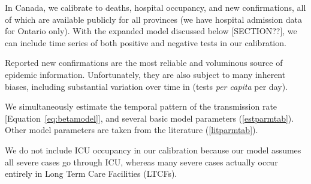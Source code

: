 \documentclass[12pt]{article}\usepackage[]{graphicx}\usepackage[]{color}
\begin{document}
In Canada, we calibrate
to deaths, hospital occupancy, and new confirmations, all of which are
available publicly for all provinces (we have hospital admission data
for Ontario only).  With the expanded model discussed below [SECTION??],
we can include time series of both positive
and negative tests in our calibration. 

 

Reported new confirmations are the most reliable and voluminous source of epidemic information. 
Unfortunately, they are also subject to many inherent biases,
including substantial variation over time in 
(\ie tests \emph{per capita} per day).

We simultaneously estimate the temporal pattern of the transmission
rate [Equation~\eqref{eq:betamodel}], and several basic model
parameters (\cref{estparmtab}).  Other model parameters
are taken from the literature (\cref{litparmtab}).

We do not include ICU occupancy in our calibration because
our model assumes all severe cases go through ICU, whereas
many severe cases actually occur entirely in Long Term Care Facilities
(LTCFs). 


\end{document}
